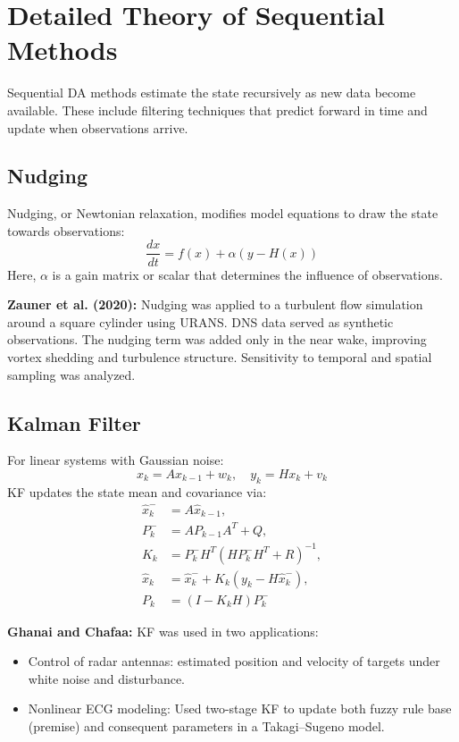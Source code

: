 \documentclass[a4paper]{article}
\begin{document}

\section{Detailed Theory of Sequential Methods}

Sequential DA methods estimate the state recursively as new data become available. These include filtering techniques that predict forward in time and update when observations arrive.

\subsection{Nudging}

Nudging, or Newtonian relaxation, modifies model equations to draw the state towards observations:
\[
\frac{dx}{dt} = f(x) + \alpha(y - H(x))
\]
Here, $\alpha$ is a gain matrix or scalar that determines the influence of observations.

\textbf{Zauner et al. (2020):} Nudging was applied to a turbulent flow simulation around a square cylinder using URANS. DNS data served as synthetic observations. The nudging term was added only in the near wake, improving vortex shedding and turbulence structure. Sensitivity to temporal and spatial sampling was analyzed.

\subsection{Kalman Filter}

For linear systems with Gaussian noise:
\[
x_k = A x_{k-1} + w_k, \quad y_k = H x_k + v_k
\]
KF updates the state mean and covariance via:
\begin{align*}
\hat{x}_k^- &= A \hat{x}_{k-1}, \\
P_k^- &= A P_{k-1} A^T + Q, \\
K_k &= P_k^- H^T (H P_k^- H^T + R)^{-1}, \\
\hat{x}_k &= \hat{x}_k^- + K_k (y_k - H \hat{x}_k^-), \\
P_k &= (I - K_k H) P_k^-
\end{align*}

\textbf{Ghanai and Chafaa:} KF was used in two applications:
\begin{itemize}
  \item Control of radar antennas: estimated position and velocity of targets under white noise and disturbance.
  \item Nonlinear ECG modeling: Used two-stage KF to update both fuzzy rule base (premise) and consequent parameters in a Takagi–Sugeno model.
\end{itemize}
\end{document}
